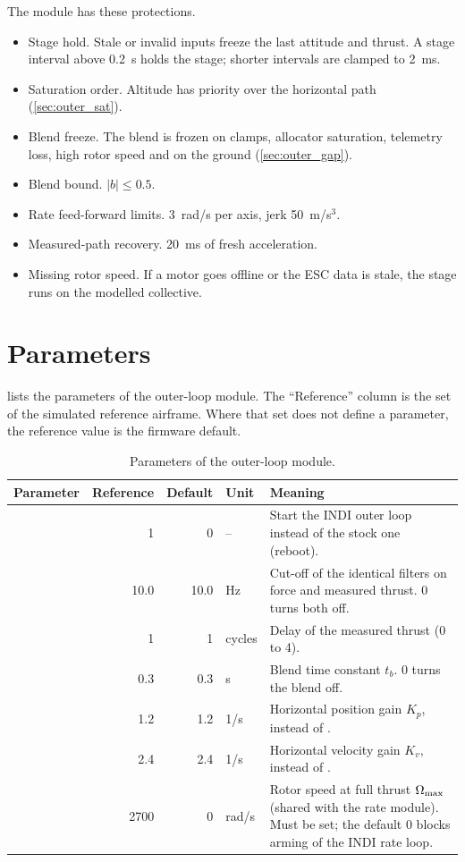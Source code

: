 The module has these protections.
\begin{itemize}
  \item Stage hold. Stale or invalid inputs freeze the last attitude and thrust. A stage interval above 0.2~s holds the stage; shorter intervals are clamped to 2~ms.
  \item Saturation order. Altitude has priority over the horizontal path (\cref{sec:outer_sat}).
  \item Blend freeze. The blend is frozen on clamps, allocator saturation, telemetry loss, high rotor speed and on the ground (\cref{sec:outer_gap}).
  \item Blend bound. $\lvert b\rvert \le 0.5$.
  \item Rate feed-forward limits. 3~rad/s per axis, jerk 50~m/s$^3$.
  \item Measured-path recovery. 20~ms of fresh acceleration.
  \item Missing rotor speed. If a motor goes offline or the ESC data is stale, the stage runs on the modelled collective.
\end{itemize}

\section{Parameters}\label{sec:outer_params}

 lists the parameters of the outer-loop module.
The ``Reference'' column is the set of the simulated reference airframe.
Where that set does not define a parameter, the reference value is the firmware default.

\begin{table}[tbp]
\caption{Parameters of the outer-loop module.}\label{tab:outer_params}
\centering
\small
\begin{tabularx}{\textwidth}{@{}L{3.5cm} r r l Y@{}}
\toprule
Parameter & Reference & Default & Unit & Meaning \\
\midrule
{} & 1 & 0 & -- & Start the INDI outer loop instead of the stock one (reboot). \\
 & 10.0 & 10.0 & Hz & Cut-off of the identical filters on force and measured thrust. 0 turns both off. \\
 & 1 & 1 & cycles & Delay of the measured thrust (0 to 4). \\
 & 0.3 & 0.3 & s & Blend time constant $t_b$. 0 turns the blend off. \\
 & 1.2 & 1.2 & 1/s & Horizontal position gain $K_p$, instead of . \\
 & 2.4 & 2.4 & 1/s & Horizontal velocity gain $K_v$, instead of . \\
 & 2700 & 0 & rad/s & Rotor speed at full thrust $\Omega_{\max}$ (shared with the rate module). Must be set; the default 0 blocks arming of the INDI rate loop. \\
\bottomrule
\end{tabularx}
\end{table}

